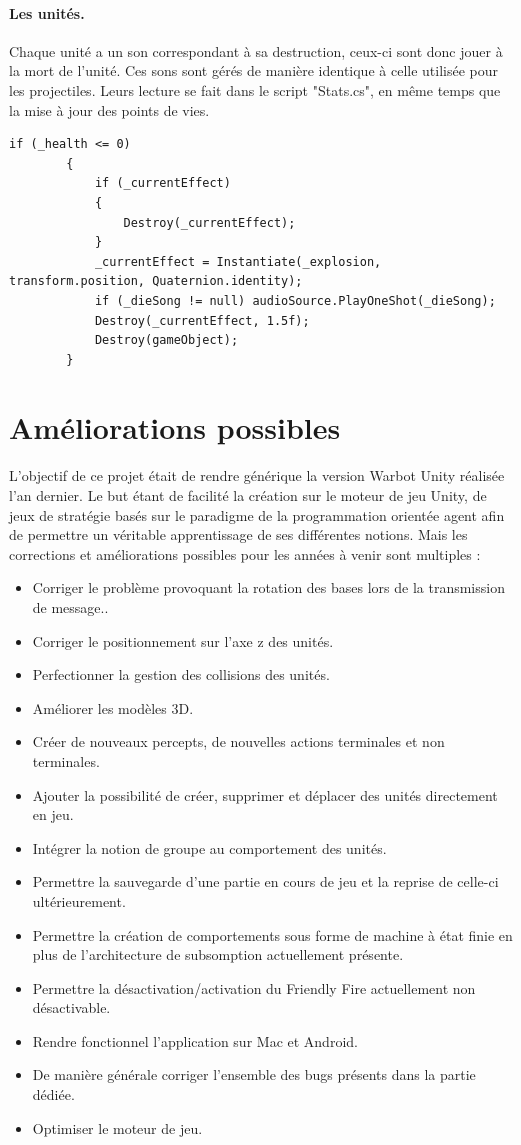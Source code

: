 \documentclass{report}
\begin{document}
\paragraph{Les unités.}
Chaque unité a un son correspondant à sa destruction, ceux-ci sont donc jouer à la mort de l'unité. Ces sons sont gérés de manière identique à celle utilisée pour les projectiles. Leurs lecture se fait dans le script "Stats.cs", en même temps que la mise à jour des points de vies. 
\begin{lstlisting}[language={[Sharp]C},label={lst:bulletAudio}, caption= Extrait du code de Stats.cs ]
if (_health <= 0)
        {
            if (_currentEffect)
            {
                Destroy(_currentEffect);
            }
            _currentEffect = Instantiate(_explosion, transform.position, Quaternion.identity);
            if (_dieSong != null) audioSource.PlayOneShot(_dieSong);
            Destroy(_currentEffect, 1.5f);
            Destroy(gameObject);
        }
\end{lstlisting}
\section{Améliorations possibles}
L’objectif de ce projet était de rendre générique la version Warbot Unity réalisée l'an dernier.
Le but étant de facilité la création sur le moteur de jeu Unity, de jeux de stratégie basés sur le paradigme de  la programmation orientée agent afin de permettre un véritable apprentissage de ses différentes notions. Mais les corrections et améliorations possibles pour les années à
venir sont multiples :
\begin{itemize}
\item Corriger le problème provoquant la rotation des bases lors de la transmission de message..
\item Corriger le positionnement sur l'axe z des unités.
\item Perfectionner la gestion des collisions des unités.
\item Améliorer les modèles 3D.
\item Créer de nouveaux percepts, de nouvelles actions terminales et non terminales.
\item Ajouter la possibilité de créer, supprimer et déplacer des unités directement en jeu.
\item Intégrer la notion de groupe au comportement des unités.
\item Permettre la sauvegarde d'une partie en cours de jeu et la reprise de celle-ci ultérieurement.
\item Permettre la création de comportements sous forme de machine à état finie en plus de l'architecture de subsomption actuellement présente.
\item Permettre la désactivation/activation du Friendly Fire actuellement non désactivable.
\item Rendre fonctionnel l'application sur Mac et Android.
\item De manière générale corriger l'ensemble des bugs présents dans la partie dédiée.
\item Optimiser le moteur de jeu.
\end{itemize}
\end{document}
